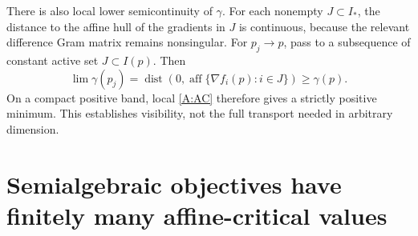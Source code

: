 There is also local lower semicontinuity of $\gamma$. For each nonempty $J\subset I_*$, the distance to the affine hull of the gradients in $J$ is continuous, because the relevant difference Gram matrix remains nonsingular. For $p_j\to p$, pass to a subsequence of constant active set $J\subset I(p)$. Then
\[
 \lim\gamma(p_j)=\operatorname{dist}(0,\operatorname{aff}\{\nabla f_i(p):i\in J\})\ge\gamma(p).
\]
On a compact positive band, local \eqref{A:AC} therefore gives a strictly positive minimum. This establishes visibility, not the full transport needed in arbitrary dimension.



\section{Semialgebraic objectives have finitely many affine-critical values}

